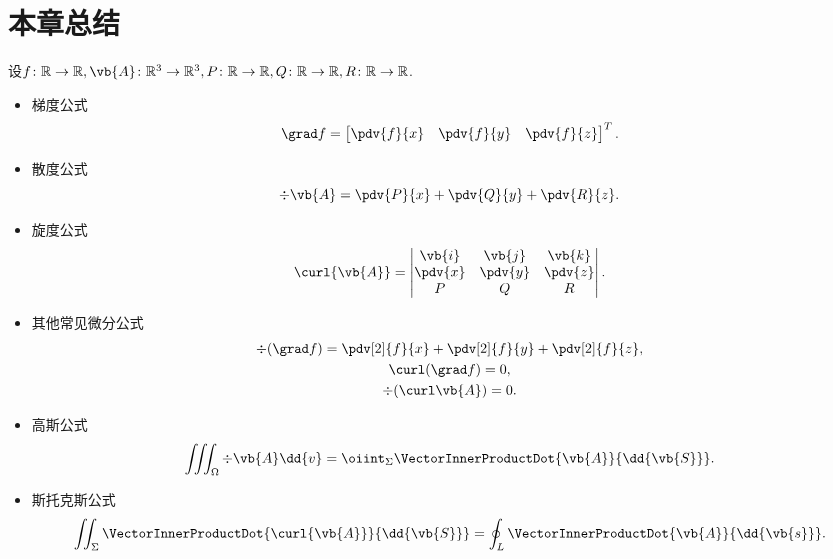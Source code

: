 \section{本章总结}
设\(f\colon\mathbb{R}\to\mathbb{R},
\vb{A}\colon\mathbb{R}^3\to\mathbb{R}^3,
P\colon\mathbb{R}\to\mathbb{R},
Q\colon\mathbb{R}\to\mathbb{R},
R\colon\mathbb{R}\to\mathbb{R}\).
\begin{itemize}
	\item 梯度公式\begin{equation*}
		\grad f
		= \begin{bmatrix}
			\pdv{f}{x} & \pdv{f}{y} & \pdv{f}{z}
		\end{bmatrix}^T.
	\end{equation*}

	\item 散度公式\begin{equation*}
		\div{\vb{A}}
		= \pdv{P}{x}+\pdv{Q}{y}+\pdv{R}{z}.
	\end{equation*}

	\item 旋度公式\begin{equation*}
		\curl{\vb{A}}
		= \begin{vmatrix}
			\vb{i} & \vb{j} & \vb{k} \\
			\pdv{x} & \pdv{y} & \pdv{z} \\
			P & Q & R
		\end{vmatrix}.
	\end{equation*}

	\item 其他常见微分公式\begin{gather*}
		\div(\grad f)
		= \pdv[2]{f}{x} + \pdv[2]{f}{y} + \pdv[2]{f}{z}, \\
		\curl(\grad f)
		= 0, \\
		\div(\curl \vb{A})
		= 0.
	\end{gather*}

	\item 高斯公式\begin{equation*}
		\iiint_\Omega \div{\vb{A}} \dd{v}
		= \oiint_\Sigma \VectorInnerProductDot{\vb{A}}{\dd{\vb{S}}}.
	\end{equation*}

	\item 斯托克斯公式\begin{equation*}
		\iint_\Sigma \VectorInnerProductDot{\curl{\vb{A}}}{\dd{\vb{S}}}
		= \oint_L \VectorInnerProductDot{\vb{A}}{\dd{\vb{s}}}.
	\end{equation*}
\end{itemize}

